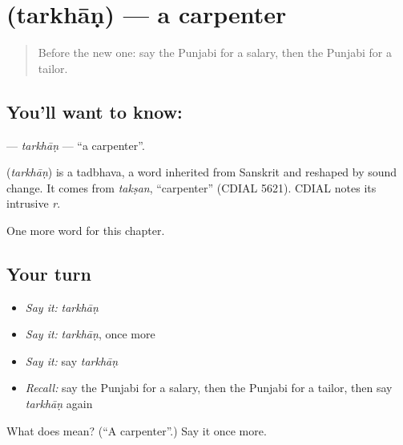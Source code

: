 \section[\texorpdfstring{\pa{ਤਰਖਾਣ} (tarkhāṇ)}{ਤਰਖਾਣ (tarkhāṇ)}]{ (tarkhāṇ) — a carpenter}

\label{lesson:PA-C139-tarkhan}



\begin{quote}
Before the new one: say the Punjabi for a salary, then the Punjabi for a tailor.
\end{quote}

\subsection*{You'll want to know: }
\textbf{} — \emph{tarkhāṇ} — \textquotedblleft{}a carpenter\textquotedblright{}.

\begin{cousinweb}
\textbf{} (\emph{tarkhāṇ}) is a tadbhava, a word inherited from Sanskrit and reshaped by sound change. It comes from \emph{takṣan}, \textquotedblleft{}carpenter\textquotedblright{} (CDIAL 5621). CDIAL notes its intrusive \emph{r}.
\end{cousinweb}

\begin{grammarlens}[title={What you've built}]
One more word for this chapter.
\end{grammarlens}

\subsection*{Your turn}
\begin{itemize}
\raggedright
  \item \emph{Say it:} \emph{tarkhāṇ}
  \item \emph{Say it:} \emph{tarkhāṇ}, once more
  \item \emph{Say it:} say \emph{tarkhāṇ}
  \item \emph{Recall:} say the Punjabi for a salary, then the Punjabi for a tailor, then say \emph{tarkhāṇ} again
\end{itemize}

\begin{tcolorbox}[breakable,colback=teal!4,colframe=teal!35!black,title={Before you move on}]
What does  mean? (\textquotedblleft{}A carpenter\textquotedblright{}.) Say it once more.
\end{tcolorbox}
